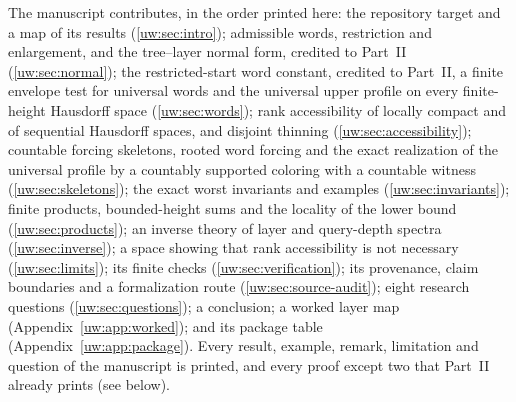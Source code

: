 \documentclass[11pt,letterpaper]{article}
\numberwithin{equation}{section}
\theoremstyle{definition}
\theoremstyle{remark}
\theoremstyle{definition}
\begin{document}
The manuscript contributes, in the order printed here: the repository
target and a map of its results (\cref{uw:sec:intro}); admissible words,
restriction and enlargement, and the tree--layer normal form, credited to
Part~II (\cref{uw:sec:normal}); the restricted-start word constant, credited
to Part~II, a finite envelope test for universal words and the universal
upper profile on every finite-height Hausdorff space (\cref{uw:sec:words});
rank accessibility of locally compact and of sequential Hausdorff spaces,
and disjoint thinning (\cref{uw:sec:accessibility}); countable forcing
skeletons, rooted word forcing and the exact realization of the universal
profile by a countably supported coloring with a countable witness
(\cref{uw:sec:skeletons}); the exact worst invariants and examples
(\cref{uw:sec:invariants}); finite products, bounded-height sums and the
locality of the lower bound (\cref{uw:sec:products}); an inverse theory of
layer and query-depth spectra (\cref{uw:sec:inverse}); a space showing that
rank accessibility is not necessary (\cref{uw:sec:limits}); its finite
checks (\cref{uw:sec:verification}); its provenance, claim boundaries and a
formalization route (\cref{uw:sec:source-audit}); eight research questions
(\cref{uw:sec:questions}); a conclusion; a worked layer map
(Appendix~\ref{uw:app:worked}); and its package table
(Appendix~\ref{uw:app:package}). Every result, example, remark, limitation
and question of the manuscript is printed, and every proof except two that
Part~II already prints (see below).
\end{document}
